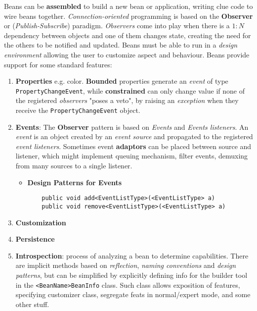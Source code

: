 Beans can be \textbf{assembled} to build a new bean or application, writing clue code to wire beans together.
\textit{Connection-oriented} programming is based on the \textbf{Observer} or (\textit{Publish-Subscribe}) paradigm.
\textit{Observers} come into play when there is a $1:N$ dependency between objects and one of them changes state, creating the need for the others to be notified and updated.
Beans must be able to run in a \textit{design environment} allowing the user to customize aspect and behaviour.
Beans provide support for some standard features:
\begin{enumerate}
    \item \textbf{Properties} e.g. color. 
    \textbf{Bounded} properties generate an \textit{event} of type \lstinline{PropertyChangeEvent},
    while \textbf{constrained} can only change value if none of the registered \textit{observers} "poses a veto",
    by raising an \textit{exception} when they receive the \lstinline{PropertyChangeEvent} object.
    \item \textbf{Events}: The \textbf{Observer} pattern is based on \textit{Events} and \textit{Events listeners}.
    An \textit{event} is an object created by an \textit{event source} and propagated to the registered \textit{event listeners}.
    Sometimes event \textbf{adaptors} can be placed between source and listener, 
    which might implement queuing mechanism, filter events, demuxing from many sources to a single listener.
    \begin{itemize}
        \item \textbf{Design Patterns for Events}
        \begin{lstlisting}
    public void add<EventListType>(<EventListType> a)
    public void remove<EventListType>(<EventListType> a)
        \end{lstlisting}
    \end{itemize}
    \item \textbf{Customization}
    \item \textbf{Persistence}
    \item \textbf{Introspection}: process of analyzing a bean to determine capabilities.
    There are implicit methods based on \textit{reflection}, \textit{naming conventions} and \textit{design patterns},
    but can be simplified by explicitly defining info for the builder tool in the \lstinline{<BeanName>BeanInfo} class.
    Such class allows exposition of features, specifying customizer class, segregate feats in normal/expert mode, and some other stuff.
    \begin{itemize}

\end{itemize}
\end{enumerate}
